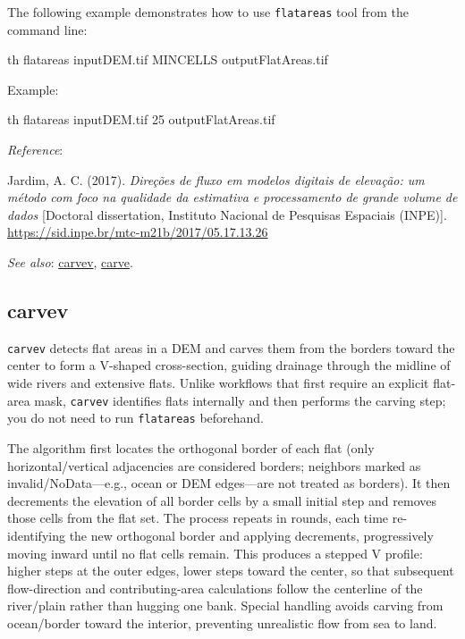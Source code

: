 \documentclass[
]{book}
\newenvironment{Shaded}{\begin{snugshade}}{\end{snugshade}}
\newcommand{\ExtensionTok}[1]{#1}
\newcommand{\NormalTok}[1]{#1}
\begin{document}
The following example demonstrates how to use \texttt{flatareas} tool from the command line:

\begin{Shaded}
\begin{Highlighting}[]
\ExtensionTok{th}\NormalTok{ flatareas inputDEM.tif MINCELLS outputFlatAreas.tif}
\end{Highlighting}
\end{Shaded}

Example:

\begin{Shaded}
\begin{Highlighting}[]
\ExtensionTok{th}\NormalTok{ flatareas inputDEM.tif 25 outputFlatAreas.tif}
\end{Highlighting}
\end{Shaded}

\emph{Reference}:

Jardim, A. C. (2017). \emph{Direções de fluxo em modelos digitais de elevação: um método com foco na qualidade da estimativa e processamento de grande volume de dados} {[}Doctoral dissertation, Instituto Nacional de Pesquisas Espaciais (INPE){]}. \href{http://mtc-m21b.sid.inpe.br/col/sid.inpe.br/mtc-m21b/2017/05.17.13.26/doc/publicacao.pdf?metadatarepository=sid.inpe.br/mtc-m21b/2017/05.17.13.26.57&mirror=sid.inpe.br/mtc-m21b/2013/09.26.14.25.22&languagebutton=en}{https://sid.inpe.br/mtc-m21b/2017/05.17.13.26}

\emph{See also}: \hyperref[carvev]{carvev}, \hyperref[carve]{carve}.

\subsection{carvev}\label{carvev}

\texttt{carvev} detects flat areas in a DEM and carves them from the borders toward the center to form a V-shaped cross-section, guiding drainage through the midline of wide rivers and extensive flats. Unlike workflows that first require an explicit flat-area mask, \texttt{carvev} identifies flats internally and then performs the carving step; you do not need to run \texttt{flatareas} beforehand.

The algorithm first locates the orthogonal border of each flat (only horizontal/vertical adjacencies are considered borders; neighbors marked as invalid/NoData---e.g., ocean or DEM edges---are not treated as borders). It then decrements the elevation of all border cells by a small initial step and removes those cells from the flat set. The process repeats in rounds, each time re-identifying the new orthogonal border and applying decrements, progressively moving inward until no flat cells remain. This produces a stepped V profile: higher steps at the outer edges, lower steps toward the center, so that subsequent flow-direction and contributing-area calculations follow the centerline of the river/plain rather than hugging one bank. Special handling avoids carving from ocean/border toward the interior, preventing unrealistic flow from sea to land.
\end{document}
